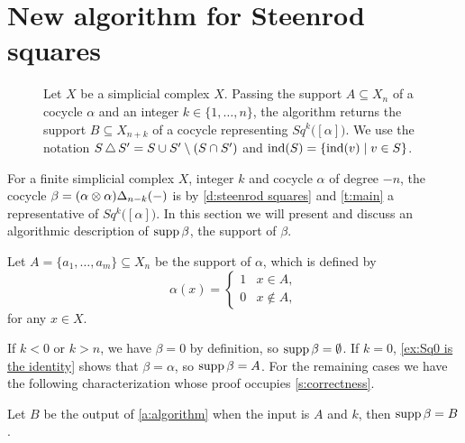
\section{New algorithm for Steenrod squares} \label{s:algorithm}

\begin{figure}[b]
	
	\caption{Let $X$ be a simplicial complex $X$.
		Passing the support $A \subseteq X_n$ of a cocycle $\alpha$ and an integer $k \in \{1, \dots, n\}$, the algorithm returns the support $B \subseteq X_{n+k}$ of a cocycle representing $Sq^k \big( [\alpha] \big)$.
		We use the notation $S \operatorname{\triangle} S^\prime = S \cup S^\prime \setminus (S \cap S^\prime)$ and $\mathrm{ind}(S) = \{\mathrm{ind}(v) \mid v \in S\}$.}
	\label{f:algorithm}
\end{figure}

For a finite simplicial complex $X$, integer $k$ and cocycle $\alpha$ of degree $-n$, the cocycle $\beta = (\alpha \otimes \alpha)\Delta_{n-k}(-)$ is by
\cref{d:steenrod squares} and \cref{t:main} a representative of $Sq^k \big( [\alpha] \big)$.
In this section we will present and discuss an algorithmic description of $\operatorname{supp} \beta$, the support of $\beta$.

Let $A = \{a_1, \dots, a_m\} \subseteq X_n$ be the support of $\alpha$, which is defined by
\[
\alpha(x) = \begin{cases}
1 & x \in A, \\ 0 & x \not\in A,
\end{cases}
\]
for any $x \in X$.

If $k < 0$ or $k > n$, we have $\beta = 0$ by definition,
so $\operatorname{supp} \beta = \emptyset$.
If $k = 0$, \cref{ex:Sq0 is the identity} shows that $\beta = \alpha$, so $\operatorname{supp} \beta = A$.
For the remaining cases we have the following characterization whose proof occupies \cref{s:correctness}.

\begin{theorem} \label{t:algorithm}
	Let $B$ be the output of \cref{a:algorithm} when the input is $A$ and $k$, then $\operatorname{supp} \beta = B$.
\end{theorem}

